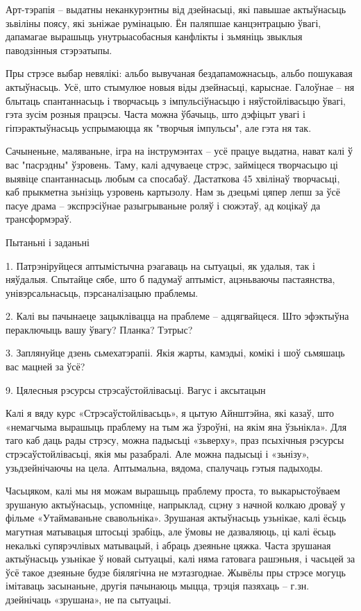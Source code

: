 Арт-тэрапія – выдатны неканкурэнтны від дзейнасьці, які павышае актыўнасьць зьвіліны поясу, які зьніжае румінацыю. Ён паляпшае канцэнтрацыю ўвагі, дапамагае вырашыць унутрыасобасныя канфлікты і зьмяніць звыклыя паводзінныя стэрэатыпы. 

Пры стрэсе выбар невялікі: альбо вывучаная бездапаможнасьць, альбо пошукавая актыўнасьць. Усё, што стымулюе новыя віды дзейнасьці, карыснае. Галоўнае – ня блытаць спантаннасьць і творчасьць з імпульсіўнасьцю і няўстойлівасьцю ўвагі, гэта зусім розныя працэсы. Часта можна ўбачыць, што дэфіцыт увагі і гіпэрактыўнасьць успрымаюцца як "творчыя імпульсы", але гэта ня так.

Сачыненьне, маляваньне, ігра на інструмэнтах – усё працуе выдатна, нават калі ў вас "пасрэдны" ўзровень. Таму, калі адчуваеце стрэс, займіцеся творчасьцю ці выявіце спантаннасьць любым са спосабаў. Дастаткова 45 хвілінаў творчасьці, каб прыкметна зьнізіць узровень картызолу. Нам зь дзецьмі цяпер лепш за ўсё пасуе драма – экспрэсіўнае разыгрываньне роляў і сюжэтаў, ад коцікаў да трансформэраў.

Пытаньні і заданьні

1. Патрэніруйцеся аптымістычна рэагаваць на сытуацыі, як удалыя, так і няўдалыя. Спытайце сябе, што б падумаў аптыміст, ацэньваючы пастаянства, унівэрсальнасьць, пэрсаналізацыю праблемы.

2. Калі вы пачынаеце зацыклівацца на праблеме – адцягвайцеся. Што эфэктыўна пераключыць вашу ўвагу? Планка? Тэтрыс?

3. Заплянуйце дзень сьмехатэрапіі. Якія жарты, камэдыі, комікі і шоў сьмяшаць вас мацней за ўсё?


9. Цялесныя рэсурсы стрэсаўстойлівасьці. Вагус і аксытацын

Калі я вяду курс «Стрэсаўстойлівасьць», я цытую Айнштэйна, які казаў, што «немагчыма вырашыць праблему на тым жа ўзроўні, на якім яна ўзьнікла». Для таго каб даць рады стрэсу, можна падысьці «зьверху», праз псыхічныя рэсурсы стрэсаўстойлівасьці, якія мы разабралі. Але можна падысьці і «зьнізу», узьдзейнічаючы на цела. Аптымальна, вядома, спалучаць гэтыя падыходы.

Часьцяком, калі мы ня можам вырашыць праблему проста, то выкарыстоўваем зрушаную актыўнасьць, успомніце, напрыклад, сцэну з начной колкаю дроваў у фільме «Утаймаваньне свавольніка». Зрушаная актыўнасьць узьнікае, калі ёсьць магутная матывацыя штосьці зрабіць, але ўмовы не дазваляюць, ці калі ёсьць некалькі супярэчлівых матывацый, і абраць дзеяньне цяжка. Часта зрушаная актыўнасьць узьнікае ў новай сытуацыі, калі няма гатовага рашэньня, і часьцей за ўсё такое дзеяньне будзе біялягічна не мэтазгоднае. Жывёлы пры стрэсе могуць імітаваць засынаньне, другія пачынаюць мыцца, трэція пазяхаць – г.зн. дзейнічаць «зрушана», не па сытуацыі.

